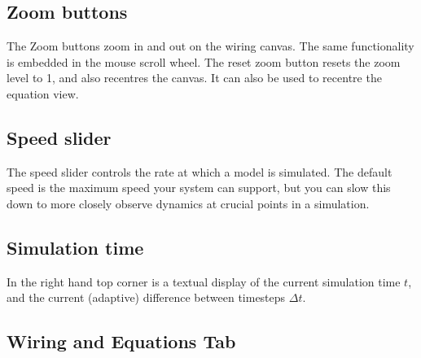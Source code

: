 %
%
%
%
%
%
%

\subsection{Zoom buttons}
\label{ZoomButtons}


The Zoom buttons zoom in and out on the wiring canvas. The same functionality
is embedded in the mouse scroll wheel. The reset zoom button
 resets the zoom level to 1, and also
recentres the canvas. It can also be used to recentre the equation view.

\subsection{Speed slider}
\label{Speedslider}


The speed slider controls the rate at which a model is simulated. The
default speed is the maximum speed your system can support, but you
can slow this down to more closely observe dynamics at crucial points
in a simulation.

\subsection{Simulation time}
\label{SimTime}

In the right hand top corner is a textual display of the current
simulation time $t$, and the current (adaptive) difference between
timesteps $\Delta t$.

\subsection{Wiring and Equations Tab}
\label{WiringEquationsTab}


